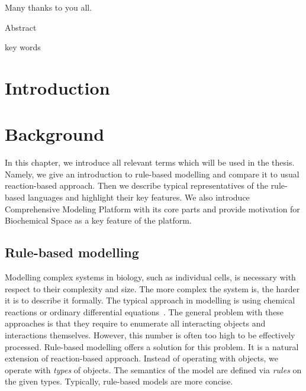\documentclass[12pt]{fithesis2}
\begin{document}
\FrontMatter
\ThesisTitlePage

\begin{ThesisDeclaration}
\DeclarationText
\AdvisorName
\end{ThesisDeclaration}

\begin{ThesisThanks}
Many thanks to you all.
\end{ThesisThanks}

\begin{ThesisAbstract}
Abstract
\end{ThesisAbstract}

\begin{ThesisKeyWords}
key words
\end{ThesisKeyWords}

\MainMatter
\tableofcontents

\chapter{Introduction}

\chapter{Background}

In this chapter, we introduce all relevant terms which will be used in the thesis. Namely, we give an introduction to rule-based modelling and compare it to usual reaction-based approach. Then we describe typical representatives of the rule-based languages and highlight their key features. We also introduce Comprehensive Modeling Platform with its core parts and provide motivation for Biochemical Space as a key feature of the platform.

\section{Rule-based modelling}
\label{Rule-based basics}

Modelling complex systems in biology, such as individual cells, is necessary with respect to their complexity and size. The more complex the system is, the harder it is to describe it formally. The typical approach in modelling is using chemical reactions or ordinary differential equations~\cite{coddington1955theory}. The general problem with these approaches is that they require to enumerate all interacting objects and interactions themselves. However, this number is often too high to be effectively processed. Rule-based modelling offers a solution for this problem. It is a natural extension of reaction-based approach. Instead of operating with objects, we operate with \emph{types} of objects. The semantics of the model are defined via \emph{rules} on the given types. Typically, rule-based models are more concise.
\end{document}
